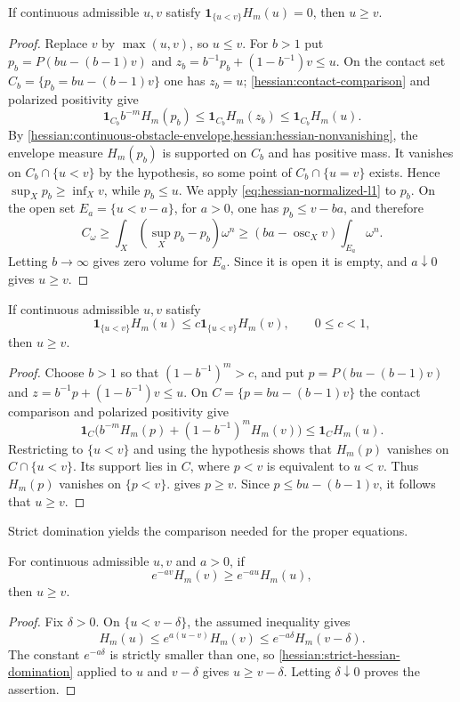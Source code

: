 \begin{proposition}\label{hessian:zero-hessian-domination}
If continuous admissible $u,v$ satisfy
$\mathbf1_{\{u<v\}}H_m(u)=0$, then $u\geq v$.
\end{proposition}
\begin{proof}
Replace $v$ by $\max(u,v)$, so $u\leq v$.
For $b>1$ put $p_b=P(bu-(b-1)v)$ and
$z_b=b^{-1}p_b+(1-b^{-1})v\leq u$.
On the contact set $C_b=\{p_b=bu-(b-1)v\}$ one has $z_b=u$;
\cref{hessian:contact-comparison} and polarized positivity give
\[
 \mathbf1_{C_b}b^{-m}H_m(p_b)
                 \leq\mathbf1_{C_b}H_m(z_b)
                 \leq\mathbf1_{C_b}H_m(u).
\]
By \cref{hessian:continuous-obstacle-envelope,hessian:hessian-nonvanishing},
the envelope measure $H_m(p_b)$ is supported on $C_b$ and has positive mass.
It vanishes on $C_b\cap\{u<v\}$ by the hypothesis, so some point of
$C_b\cap\{u=v\}$ exists. Hence
$\sup_Xp_b\geq\inf_Xv$, while $p_b\leq u$.
We apply \eqref{eq:hessian-normalized-l1} to $p_b$. On the open set $E_a=\{u<v-a\}$, for $a>0$, one has
$p_b\leq v-ba$, and therefore
\[
 C_\omega\geq\int_X(\sup_Xp_b-p_b)\omega^n
                     \geq(ba-\operatorname{osc}_Xv)\int_{E_a}\omega^n.
\]
Letting $b\to\infty$ gives zero volume for $E_a$. Since it is open it
is empty, and $a\downarrow0$ gives $u\geq v$.
\end{proof}

\begin{proposition}\label{hessian:strict-hessian-domination}
If continuous admissible $u,v$ satisfy
\[
 \mathbf1_{\{u<v\}}H_m(u)\leq
                    c\mathbf1_{\{u<v\}}H_m(v),\qquad 0\leq c<1,
\]
then $u\geq v$.
\end{proposition}
\begin{proof}
Choose $b>1$ so that $(1-b^{-1})^m>c$, and put
$p=P(bu-(b-1)v)$ and $z=b^{-1}p+(1-b^{-1})v\leq u$.
On $C=\{p=bu-(b-1)v\}$ the contact comparison and polarized positivity give
\[
 \mathbf1_C\bigl(b^{-m}H_m(p)+(1-b^{-1})^mH_m(v)\bigr)
                                  \leq\mathbf1_C H_m(u).
\]
Restricting to $\{u<v\}$ and using the hypothesis shows that
$H_m(p)$ vanishes on $C\cap\{u<v\}$. Its support lies in $C$, where
$p<v$ is equivalent to $u<v$. Thus $H_m(p)$ vanishes on $\{p<v\}$.
 gives $p\geq v$.
Since $p\leq bu-(b-1)v$, it follows that $u\geq v$.
\end{proof}

Strict domination yields the comparison needed for the proper equations.

\begin{lemma}\label{hessian:hessian-exponential-order}
For continuous admissible $u,v$ and $a>0$, if
\[
 e^{-av}H_m(v)\geq e^{-au}H_m(u),
\]
then $u\geq v$.
\end{lemma}
\begin{proof}
Fix $\delta>0$. On $\{u<v-\delta\}$, the assumed inequality gives
\[
 H_m(u)\leq e^{a(u-v)}H_m(v)
       \leq e^{-a\delta}H_m(v-\delta).
\]
The constant $e^{-a\delta}$ is strictly smaller than one, so \cref{hessian:strict-hessian-domination} applied to $u$ and $v-\delta$ gives $u\geq v-\delta$. Letting $\delta\downarrow0$ proves the assertion.
\end{proof}
